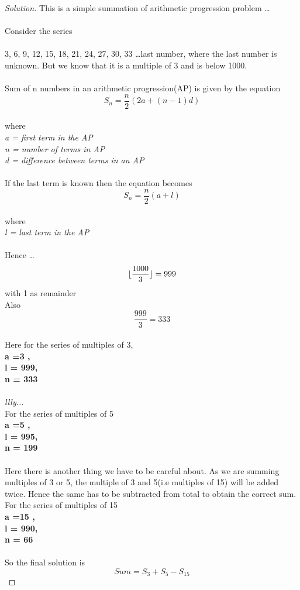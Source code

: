 \documentclass[12pt]{article}
\DeclarePairedDelimiter\floor{\lfloor}{\rfloor}
\newenvironment{solution}{\begin{proof}[Solution]}{\end{proof}}
\begin{document}
\begin{solution}
This is a simple summation of arithmetic progression problem \dots
\\\\Consider the series
\\\\3, 6, 9, 12, 15, 18, 21, 24, 27, 30, 33 \dots last number, where the last number is unknown. But we know that it is a multiple of 3 and is below 1000.
\\\\Sum of n numbers in an arithmetic progression(AP) is given by the equation
\\ \[S_n = \frac{n}{2}(2a+(n-1)d)\]
\\where 
\\ \textit{ a = first term in the AP
\\n = number of terms in AP
\\d = difference between terms in an AP
}
\\
\\If the last term is known then the equation becomes
\\\[S_n = \frac{n}{2}(a + l)\]
\\where 
\\ \textit{ l = last term in the AP}
\\\\Hence \dots 
\\ \[ \floor{\frac{1000}{3}} = 999\] with 1 as remainder
\\Also \[\frac{999}{3} = 333\]
\\Here for the series of multiples of 3,
\textbf{
\\ a =3 ,
\\l = 999,
\\n = 333
}
\\
\\
\textit{llly...}
\\For the series of multiples of 5
\textbf{
\\ a =5 ,
\\l = 995,
\\n = 199
}
\\
\\Here there is another thing we have to be careful about. As we are summing multiples of 3 or 5, the multiple of 3 and 5(i.e multiples of 15) will be added twice. Hence the same has to be subtracted from total to obtain the correct sum.
\\For the series of multiples of 15
\textbf{
\\ a =15 ,
\\l = 990,
\\n = 66
}
\\
\\So the final solution is
\\\[Sum = S_3 + S_5 - S_{15}\]

\end{solution} 
\end{document}
